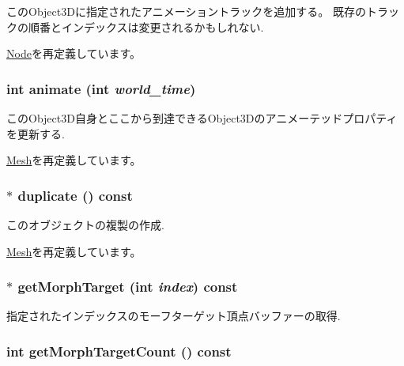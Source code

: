 このObject3Dに指定されたアニメーショントラックを追加する。 既存のトラックの順番とインデックスは変更されるかもしれない. 

\hyperlink{classm3g_1_1Node_415c0b110f95410ded9b85e5d99a496b}{Node}を再定義しています。\hypertarget{classm3g_1_1MorphingMesh_8aad1ceab4c2a03609c8a42324ce484d}{
\subsubsection[{animate}]{\setlength{\rightskip}{0pt plus 5cm}int animate (int {\em world\_\-time})}}
\label{classm3g_1_1MorphingMesh_8aad1ceab4c2a03609c8a42324ce484d}


このObject3D自身とここから到達できるObject3Dのアニメーテッドプロパティを更新する. 

\hyperlink{classm3g_1_1Mesh_8aad1ceab4c2a03609c8a42324ce484d}{Mesh}を再定義しています。\hypertarget{classm3g_1_1MorphingMesh_7e7b2c3c4c988c6341a5e249bd468f57}{
\subsubsection[{duplicate}]{ $\ast$ duplicate () const}}
\label{classm3g_1_1MorphingMesh_7e7b2c3c4c988c6341a5e249bd468f57}


このオブジェクトの複製の作成. 

\hyperlink{classm3g_1_1Mesh_52ce6d0b3eda2bd3a95bfb5b7dbb6f82}{Mesh}を再定義しています。\hypertarget{classm3g_1_1MorphingMesh_44766cc08b595f074d0d698c75f544b4}{
\subsubsection[{getMorphTarget}]{ $\ast$ getMorphTarget (int {\em index}) const}}
\label{classm3g_1_1MorphingMesh_44766cc08b595f074d0d698c75f544b4}


指定されたインデックスのモーフターゲット頂点バッファーの取得. \hypertarget{classm3g_1_1MorphingMesh_620d9684124201f738a28c7c39641541}{
\subsubsection[{getMorphTargetCount}]{\setlength{\rightskip}{0pt plus 5cm}int getMorphTargetCount () const}}
\label{classm3g_1_1MorphingMesh_620d9684124201f738a28c7c39641541}


